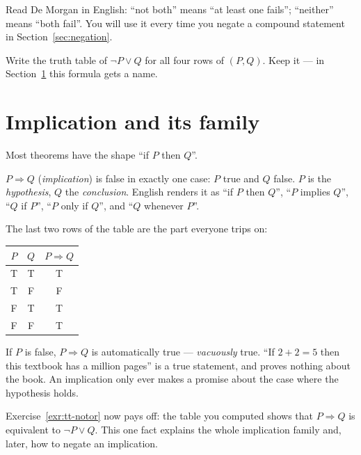Read De Morgan in English: ``not both'' means ``at least one fails''; ``neither''
means ``both fail''. You will use it every time you negate a compound statement in
Section~\ref{sec:negation}.

\begin{exercise}[easy]\label{exr:tt-notor}
Write the truth table of $\lnot P \lor Q$ for all four rows of $(P,Q)$. Keep it ---
in Section~\ref{sec:implication} this formula gets a name.
\end{exercise}

\section{Implication and its family}\label{sec:implication}

Most theorems have the shape ``if $P$ then $Q$''.

\begin{definition}[Implication]
$P \Rightarrow Q$ (\emph{implication}) is false in exactly one case: $P$ true and $Q$
false. $P$ is the \emph{hypothesis}, $Q$ the \emph{conclusion}. English renders it as
``if $P$ then $Q$'', ``$P$ implies $Q$'', ``$Q$ if $P$'', ``$P$ only if $Q$'', and
``$Q$ whenever $P$''.
\end{definition}

The last two rows of the table are the part everyone trips on:

\begin{center}
\begin{tabular}{cc|c}
\toprule
$P$ & $Q$ & $P\Rightarrow Q$\\
\midrule
T&T&T\\
T&F&F\\
F&T&T\\
F&F&T\\
\bottomrule
\end{tabular}
\end{center}

\begin{remark}
If $P$ is false, $P \Rightarrow Q$ is automatically true --- \emph{vacuously} true.
``If $2+2=5$ then this textbook has a million pages'' is a true statement, and proves
nothing about the book. An implication only ever makes a promise about the case where
the hypothesis holds.
\end{remark}

Exercise~\ref{exr:tt-notor} now pays off: the table you computed shows that
$P \Rightarrow Q$ is equivalent to $\lnot P \lor Q$. This one fact explains the whole
implication family and, later, how to negate an implication.

